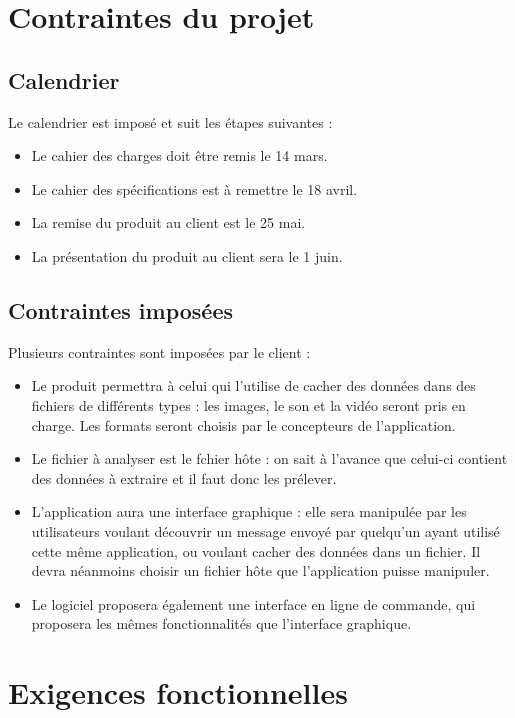 \documentclass[11pt]{article}
\begin{document}
\section{Contraintes du projet}

\subsection{Calendrier}

Le calendrier est imposé et suit les étapes suivantes : 

\begin{itemize}
\item Le cahier des charges doit être remis le 14 mars.
\item Le cahier des spécifications est à remettre le 18 avril.
\item La remise du produit au client est le 25 mai.
\item La présentation du produit au client sera le 1 juin.
\end{itemize}


\subsection{Contraintes imposées}

Plusieurs contraintes sont imposées par le client : 

\begin{itemize}
\item Le produit permettra à celui qui l'utilise de cacher des données dans des
    fichiers de différents types : les images, le son et la vidéo seront pris
    en charge. Les formats seront choisis par le concepteurs de
    l'application. 
\item Le fichier à analyser est le fchier hôte : on sait à l'avance que celui-ci
    contient des données à extraire et il faut donc les prélever. 
\item L'application aura une interface graphique : elle sera manipulée par les
    utilisateurs voulant découvrir un message envoyé par quelqu'un ayant
    utilisé cette même application, ou voulant cacher des données dans un
    fichier. Il devra néanmoins choisir un fichier hôte que l'application
    puisse manipuler. 
\item Le logiciel proposera également une interface en ligne de commande, qui
    proposera les mêmes fonctionnalités que l'interface graphique. 
\end{itemize}

\section{Exigences fonctionnelles}
\end{document}
